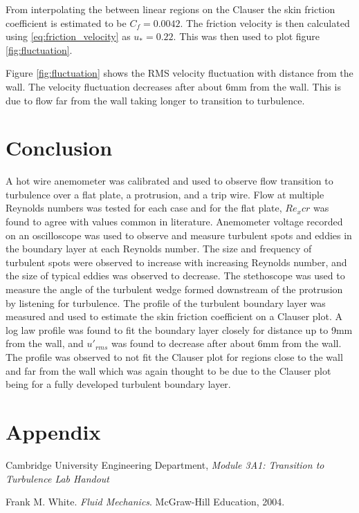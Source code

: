 \documentclass{article}
\begin{document}
From interpolating the between linear regions on the Clauser the skin friction coefficient is estimated to be $C_f = 0.0042$.
The friction velocity is then calculated using \ref{eq:friction_velocity} as $u_* = 0.22$.
This was then used to plot figure \ref{fig:fluctuation}.


Figure \ref{fig:fluctuation} shows the RMS velocity fluctuation with distance from the wall.
The velocity fluctuation decreases after about 6mm from the wall.
This is due to flow far from the wall taking longer to transition to turbulence.

\newpage

\section{Conclusion}

A hot wire anemometer was calibrated and used to observe flow transition to turbulence over a flat plate, a protrusion, and a trip wire.
Flow at multiple Reynolds numbers was tested for each case and for the flat plate, $Re_xcr$ was found to agree with values common in literature.
Anemometer voltage recorded on an oscilloscope was used to observe and measure turbulent spots and eddies in the boundary layer at each Reynolds number.
The size and frequency of turbulent spots were observed to increase with increasing Reynolds number, and the size of typical eddies was observed to decrease.
The stethoscope was used to measure the angle of the turbulent wedge formed downstream of the protrusion by listening for turbulence.
The profile of the turbulent boundary layer was measured and used to estimate the skin friction coefficient on a Clauser plot.
A log law profile was found to fit the boundary layer closely for distance up to 9mm from the wall, and
$u'_{rms}$ was found to decrease after about 6mm from the wall.
The profile was observed to not fit the Clauser plot for regions close to the wall and far from the wall which was again thought to be due
to the Clauser plot being for a fully developed turbulent boundary layer.



\section{Appendix}

\begin{thebibliography}{9}
    Cambridge University Engineering Department, \textit{Module 3A1: Transition to Turbulence Lab Handout}

    Frank M. White. \textit{Fluid Mechanics}. McGraw-Hill Education, 2004.
\end{thebibliography}
\end{document}
